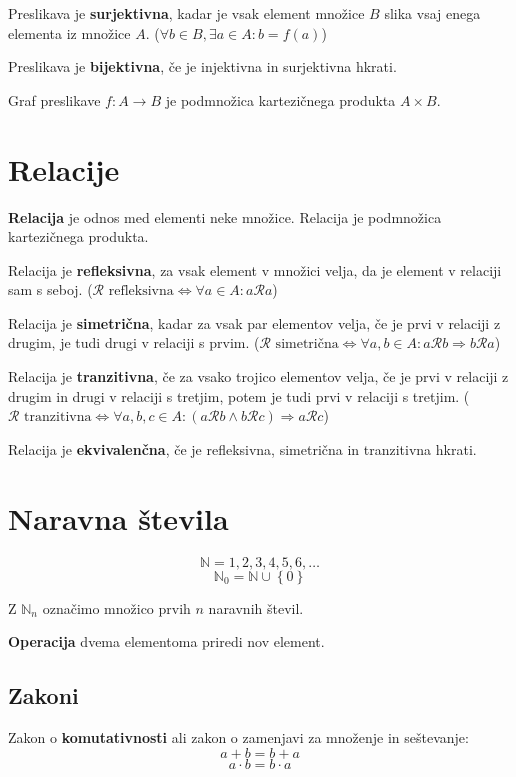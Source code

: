 \documentclass[a4paper,oneside,12pt,fleqn]{article}
\def\N{\ensuremath{\mathbb N}}
\newcommand\krat\cdot
\newcommand{\Rel}{\mathcal{R}}
\renewcommand\implies\Rightarrow
\renewcommand\iff\Leftrightarrow
\numberwithin{equation}{section}
\begin{document}
Preslikava je \textbf{surjektivna}, kadar je vsak element množice $B$ slika vsaj enega elementa iz
množice $A$. ($\forall b \in B, \exists a \in A\!: b = f(a)$)

Preslikava je \textbf{bijektivna}, če je injektivna in surjektivna hkrati.

Graf preslikave $f\!\!: A \rightarrow B$ je podmnožica kartezičnega produkta $A \times B$.

\section{Relacije}
\label{sec:relacije}
\textbf{Relacija} je odnos med elementi neke množice.
Relacija je podmnožica kartezičnega produkta.

Relacija je \textbf{refleksivna}, za vsak element v množici velja, da je element v relaciji sam s
seboj. ($\Rel \text{ refleksivna} \iff \forall a \in A\!: a \Rel a$)

Relacija je \textbf{simetrična}, kadar za vsak par elementov velja, če je prvi v relaciji z drugim,
je tudi drugi v relaciji s prvim. 
($\Rel \text{ simetrična} \iff \forall a, b \in A\!: a \Rel b \implies b \Rel a$)

Relacija je \textbf{tranzitivna}, če za vsako trojico elementov velja, če je prvi v relaciji z
drugim in drugi v relaciji s tretjim, potem je tudi prvi v relaciji s tretjim.
($\Rel \text{ tranzitivna} \iff \forall a, b, c \in A\!: (a \Rel b \land b \Rel c) \implies a \Rel c$)

Relacija je \textbf{ekvivalenčna}, če je refleksivna, simetrična in tranzitivna hkrati.

\section{Naravna števila}
\label{sec:naravna}
\[ \N = {1, 2, 3, 4, 5, 6, \ldots} \]
\[ \N_0 = \N \cup \left\{ 0 \right\} \]

Z $\N_n$ označimo množico prvih $n$ naravnih števil.

\textbf{Operacija} dvema elementoma priredi nov element.

\subsection{Zakoni}
\label{sec:naravna:zakoni}
Zakon o \textbf{komutativnosti} ali zakon o zamenjavi za množenje in seštevanje:
\[ a + b =  b + a \]
\[ a \krat b =  b \krat a \]
\end{document}
